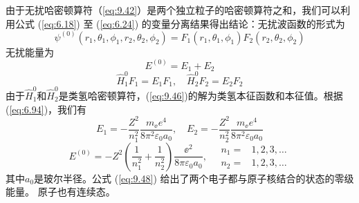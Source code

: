     由于无扰哈密顿算符（\ref{eq:9.42}）是两个独立粒子的哈密顿算符之和，我们可以利用公式 (\ref{eq:6.18}) 至 (\ref{eq:6.24}) 的变量分离结果得出结论：无扰波函数的形式为
    \begin{equation}
        \psi^{\left(0\right)}\left(r_1,\theta_1,\phi_1,r_2,\theta_2,\phi_2\right) = F_1\left(r_1,\theta_1,\phi_1\right) F_2\left(r_2,\theta_2,\phi_2\right)
        \label{eq:9.44}
    \end{equation}
    无扰能量为
    \begin{equation}
        E^{\left(0\right)} = E_1 + E_2
        \label{eq:9.45}
    \end{equation}
    \begin{equation}
        \hat{H}_1^0 F_1 = E_1 F_1, \quad \hat{H}_2^0 F_2 = E_2 F_2
        \label{eq:9.46}
    \end{equation}
    由于$\hat{H}_1^0$和$\hat{H}_2^0$是类氢哈密顿算符，(\ref{eq:9.46})的解为类氢本征函数和本征值。根据(\ref{eq:6.94})，我们有
    \begin{equation}
        E_1 = -\frac{Z^2}{n_1^2}\frac{m_{\ee }e^4}{8\pi^2\varepsilon_0a_0}, \quad E_2 = -\frac{Z^2}{n_2^2}\frac{m_{\ee }e^4}{8\pi^2\varepsilon_0a_0}
        \label{eq:9.47}
    \end{equation}
    \begin{equation}
        E^{\left(0\right)} = -Z^2\left(\frac{1}{n_1^2} + \frac{1}{n_2^2}\right)\frac{\ee ^2}{8\pi\varepsilon_0a_0}, \quad \begin{aligned}
            n_1 = & 1, 2, 3, \ldots \\
            n_2 = & 1, 2, 3, \ldots
        \end{aligned}
        \label{eq:9.48}
    \end{equation}
    其中$a_0$是玻尔半径。公式 (\ref{eq:9.48}) 给出了两个电子都与原子核结合的状态的零级能量。 原子也有连续态。

